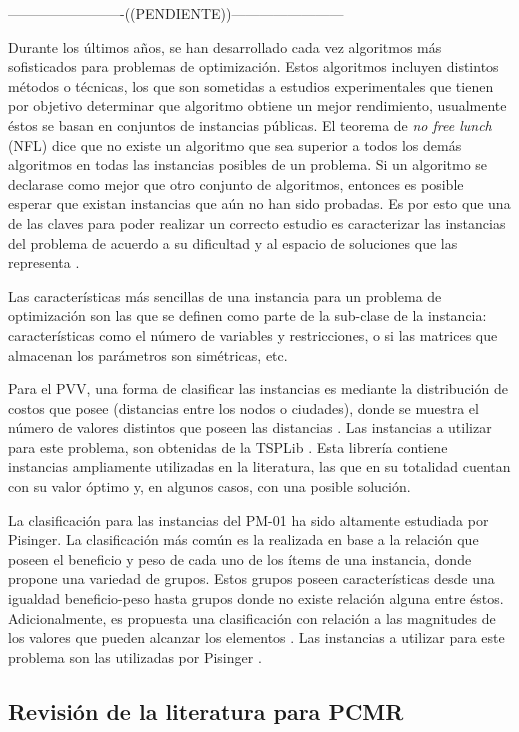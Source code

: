 -------------------------((PENDIENTE))------------------------

Durante los últimos años, se han desarrollado cada vez algoritmos más sofisticados para problemas de optimización. Estos algoritmos incluyen distintos métodos o técnicas, los que son sometidas a estudios experimentales que tienen por objetivo determinar que algoritmo obtiene un mejor rendimiento, usualmente éstos se basan en conjuntos de instancias públicas. El teorema de \textit{no free lunch} (NFL) dice que no existe un algoritmo que sea superior a todos los demás algoritmos en todas las instancias posibles de un problema. Si un algoritmo se declarase como mejor que otro conjunto de algoritmos, entonces es posible esperar que existan instancias que aún no han sido probadas. Es por esto que una de las claves para poder realizar un correcto estudio es caracterizar las instancias del problema de acuerdo a su dificultad y al espacio de soluciones que las representa \citep{smith_2012}.

Las características más sencillas de una instancia para un problema de optimización son las que se definen como parte de la sub-clase de la instancia: características como el número de variables y restricciones, o si las matrices que almacenan los parámetros son simétricas, etc.

Para el PVV, una forma de clasificar las instancias es mediante la distribución de costos que posee (distancias entre los nodos o ciudades), donde se muestra el número de valores distintos que poseen las distancias \citep{smith_2012}. Las instancias a utilizar para este problema, son obtenidas de la TSPLib \citep{reinelt_1991}. Esta librería contiene instancias ampliamente utilizadas en la literatura, las que en su totalidad cuentan con su valor óptimo y, en algunos casos, con una posible solución.

La clasificación para las instancias del PM-01 ha sido altamente estudiada por Pisinger. La clasificación más común es la realizada en base a la relación que poseen el beneficio y peso de cada uno de los ítems de una instancia, donde propone una variedad de grupos. Estos grupos poseen características desde una igualdad beneficio-peso hasta grupos donde no existe relación alguna entre éstos. Adicionalmente, es propuesta una clasificación con relación a las magnitudes de los valores que pueden alcanzar los elementos \citep{pisinger_2005}. Las instancias a utilizar para este problema son las utilizadas por Pisinger \citep{pisinger_2005}.

\subsection{Revisión de la literatura para PCMR}



